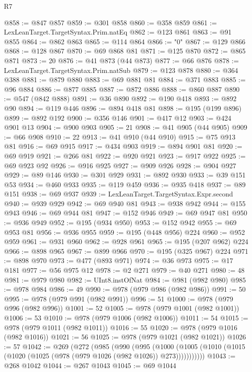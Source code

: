 \begin{lexlean}{R7}
\begin{coremodule}
@858 := @847 @857
@859 := @301 @858
@860 := @358 @859
@861 := LexLeanTarget.TargetSyntax.Prim.natEq
@862 := @123 @861
@863 := @91 @855
@864 := @862 @863
@865 := @114 @864
@866 := "0"
@867 := @129 @866
@868 := @128 @867
@870 := @69 @868 @81
@871 := @125 @870
@872 := @865 @871
@873 := 20
@876 := @41 @873 (@44 @873)
@877 := @66 @876
@878 := LexLeanTarget.TargetSyntax.Prim.natSub
@879 := @123 @878
@880 := @364 @388
@881 := @879 @880
@883 := @69 @881 @81
@884 := @371 @883
@885 := @96 @884
@886 := @877 @885
@887 := @872 @886
@888 := @860 @887
@890 := @547 (@842 @888)
@891 := @36 @890
@892 := @190 @418
@893 := @892 @90
@894 := @119 @446
@896 := @894 @418 @81
@898 := @195 (@199 @896)
@899 := @892 @192
@900 := @356 @146
@901 := @417 @12
@903 := @424 @901 @13
@904 := @900 @903
@905 := 21
@908 := @41 @905 (@44 @905)
@909 := @66 @908
@910 := 22
@913 := @41 @910 (@44 @910)
@915 := @75 @913 @81
@916 := @69 @915
@917 := @434 @903
@919 := @894 @901 @81
@920 := @69 @919
@921 := @266 @81
@922 := @920 @921
@923 := @917 @922
@925 := @69 @923 @92
@926 := @916 @925
@927 := @909 @926
@928 := @904 @927
@929 := @89 @146
@930 := @301 @929
@931 := @892 @930
@933 := @39 @151 @53
@934 := @460 @933
@935 := @119 @459
@936 := @935 @418
@937 := @89 @151
@938 := @69 @937
@939 := LexLeanTarget.TargetSyntax.Expr.second
@940 := @939 @929
@942 := @69 @940 @81
@943 := @938 @942
@944 := @155 @943
@946 := @69 @944 @81
@947 := @152 @946
@949 := @69 @947 @81
@950 := @936 @949
@952 := @195 (@934 @950)
@953 := @152 @942
@955 := @69 @953 @81
@956 := @936 @955
@959 := @195 (@448 @956) @224
@960 := @952 @959
@961 := @931 @960
@962 := @928 @961
@965 := @195 (@207 @962) @224
@966 := @898 @965
@967 := @899 @966
@970 := @195 (@325 @967) @224
@971 := @898 @970
@973 := @477 (@893 @971)
@974 := @36 @973
@975 := @17 @181
@977 := @56 @975 @12
@978 := @2 @271
@979 := @40 @271
@980 := 48
@981 := @979 @980
@982 := UInt8.instOfNat
@984 := @981 (@982 @980)
@985 := @978 @984
@986 := 49
@990 := @978 (@979 @986 (@982 @986))
@991 := 50
@995 := @978 (@979 @991 (@982 @991))
@996 := 51
@1000 := @978 (@979 @996 (@982 @996))
@1001 := 52
@1005 := @978 (@979 @1001 (@982 @1001))
@1006 := 53
@1010 := @978 (@979 @1006 (@982 @1006))
@1011 := 54
@1015 := @978 (@979 @1011 (@982 @1011))
@1016 := 55
@1020 := @978 (@979 @1016 (@982 @1016))
@1021 := 56
@1025 := @978 (@979 @1021 (@982 @1021))
@1026 := 57
@1042 := @269
    (@272
      (@985
        (@990
          (@995
            (@1000
              (@1005 (@1010 (@1015 (@1020 (@1025 (@978 (@979 @1026 (@982 @1026)) @273)))))))))))
@1043 := @268 @1042
@1044 := @267 @1043
@1045 := @69 @1044

\end{coremodule}
\end{lexlean}
